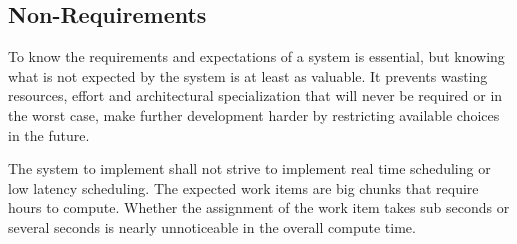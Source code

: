 \subsection{Non-Requirements}

To know the requirements and expectations of a system is essential, but knowing what is not expected by the system is at least as valuable.
It prevents wasting resources, effort and architectural specialization that will never be required or in the worst case, make further development harder by restricting available choices in the future.
 
The system to implement shall not strive to implement real time scheduling or low latency scheduling.
The expected work items are big chunks that require hours to compute.
Whether the assignment of the work item takes sub seconds or several seconds is nearly unnoticeable in the overall compute time.